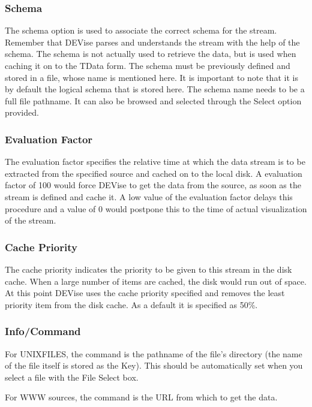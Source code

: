 \subsubsection{Schema}

The schema option is used to associate the correct schema for the stream.
Remember that DEVise parses and understands the stream with the help of the
schema. The schema is not actually used to retrieve the data, but is used when
caching it on to the TData form. The schema must be previously defined and
stored in a file, whose name is mentioned here. It is important to note that it
is by default the logical schema that is stored here. The schema name needs to
be a full file pathname. It can also be browsed and selected through the Select
option provided.

\subsubsection{Evaluation Factor}

The evaluation factor specifies the relative time at which the data stream is to
be extracted from the specified source and cached on to the local disk. A
evaluation factor of 100 would force DEVise to get the data from the source, as
soon as the stream is defined and cache it. A low value of the evaluation factor
delays this procedure and a value of 0 would postpone this to the time of actual
visualization of the stream.

\subsubsection{Cache Priority}

The cache priority indicates the priority to be given to this stream in the disk
cache. When a large number of items are cached, the disk would run out of
space. At this point DEVise uses the cache priority specified and removes the
least priority item from the disk cache. As a default it is specified as 50\%.

\subsubsection{Info/Command}

For UNIXFILES, the command is the pathname of the file's directory (the
name of the file itself is stored as the Key).  This should be automatically
set when you select a file with the File Select box.

For WWW sources, the command is the URL from which to get the data.

